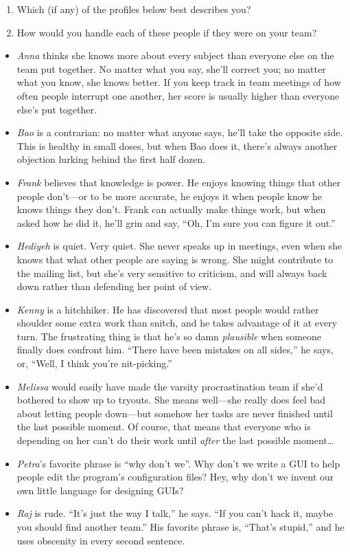 \documentclass[
]{krantz}
\providecommand{\tightlist}{%
  \setlength{\itemsep}{0pt}\setlength{\parskip}{0pt}}
\begin{document}
\begin{enumerate}
\def\labelenumi{\arabic{enumi}.}
\tightlist
\item
  Which (if any) of the profiles below best describes you?
\item
  How would you handle each of these people if they were on your team?
\end{enumerate}

\begin{itemize}
\item
  \emph{Anna} thinks she knows more about every subject
  than everyone else on the team put together.
  No matter what you say, she'll correct you;
  no matter what you know, she knows better.
  If you keep track in team meetings of how often people interrupt one another,
  her score is usually higher than everyone else's put together.
\item
  \emph{Bao} is a contrarian:
  no matter what anyone says, he'll take the opposite side.
  This is healthy in small doses,
  but when Bao does it,
  there's always another objection lurking behind the first half dozen.
\item
  \emph{Frank} believes that knowledge is power.
  He enjoys knowing things that other people don't---or to be more accurate,
  he enjoys it when people know he knows things they don't.
  Frank can actually make things work,
  but when asked how he did it,
  he'll grin and say,
  ``Oh, I'm sure you can figure it out.''
\item
  \emph{Hediyeh} is quiet.
  Very quiet.
  She never speaks up in meetings,
  even when she knows that what other people are saying is wrong.
  She might contribute to the mailing list,
  but she's very sensitive to criticism,
  and will always back down rather than defending her point of view.
\item
  \emph{Kenny} is a hitchhiker.
  He has discovered that most people would rather shoulder some extra work than snitch,
  and he takes advantage of it at every turn.
  The frustrating thing is that he's so damn \emph{plausible}
  when someone finally does confront him.
  ``There have been mistakes on all sides,'' he says,
  or,
  ``Well, I think you're nit-picking.''
\item
  \emph{Melissa} would easily have made the varsity procrastination team
  if she'd bothered to show up to tryouts.
  She means well---she really does feel bad about letting people down---but
  somehow her tasks are never finished until the last possible moment.
  Of course, that means that everyone who is depending on her can't do their work until
  \emph{after} the last possible moment\ldots{}
\item
  \emph{Petra}'s favorite phrase is ``why don't we''.
  Why don't we write a GUI to help people edit the program's configuration files?
  Hey, why don't we invent our own little language for designing GUIs?
\item
  \emph{Raj} is rude.
  ``It's just the way I talk,'' he says.
  ``If you can't hack it, maybe you should find another team.''
  His favorite phrase is, ``That's stupid,''
  and he uses obscenity in every second sentence.
\end{itemize}
\end{document}
